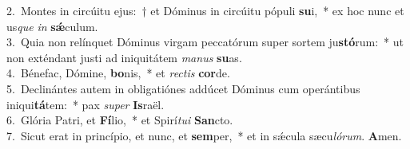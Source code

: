 {2.~}Montes in circúitu ejus:~† et Dóminus in circúitu pópuli \textbf{su}i,~* ex hoc nunc et us\textit{que} \textit{in} \textbf{sǽ}culum.\\
{3.~}Quia non relínquet Dóminus virgam peccatórum super sortem ju\textbf{stó}rum:~* ut non exténdant justi ad iniquitátem \textit{ma}\textit{nus} \textbf{su}as.\\
{4.~}Bénefac, Dómine, \textbf{bo}nis,~* et \textit{re}\textit{ctis} \textbf{cor}de.\\
{5.~}Declinántes autem in obligatiónes addúcet Dóminus cum operántibus iniqui\textbf{tá}tem:~* pax \textit{su}\textit{per} \textbf{Is}raël.\\
{6.~}Glória Patri, et \textbf{Fí}lio,~* et Spirí\textit{tu}\textit{i} \textbf{San}cto.\\
{7.~}Sicut erat in princípio, et nunc, et \textbf{sem}per,~* et in sǽcula sæcu\textit{ló}\textit{rum}. \textbf{A}men.\\
